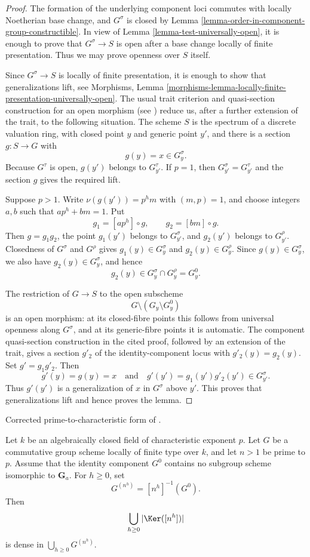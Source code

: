 \begin{proof}
The formation of the underlying component loci commutes with locally
Noetherian base change, and $G^\sigma$ is closed by
Lemma \ref{lemma-order-in-component-group-constructible}. In view of
Lemma \ref{lemma-test-universally-open}, it is enough to prove that
$G^\sigma \to S$ is open after a base change locally of finite presentation.
Thus we may prove openness over $S$ itself.

Since $G^\sigma \to S$ is locally of finite presentation, it is enough to
show that generalizations lift, see Morphisms, Lemma
\ref{morphisms-lemma-locally-finite-presentation-universally-open}. The usual
trait criterion and quasi-section construction for an open morphism
(see \cite[IV, Proposition 14.3.7]{EGA}) reduce us, after a further extension
of the trait, to the following situation. The scheme $S$ is the spectrum of a
discrete valuation ring, with closed point $y$ and generic point $y'$, and
there is a section $g : S \to G$ with
$$
g(y)=x \in G^\sigma_y.
$$
Because $G^\tau$ is open, $g(y')$ belongs to $G^\tau_{y'}$. If $p=1$, then
$G^\sigma_{y'}=G^\tau_{y'}$ and the section $g$ gives the required lift.

Suppose $p>1$. Write $\nu(g(y'))=p^h m$ with $(m,p)=1$, and choose integers
$a,b$ such that $ap^h+bm=1$. Put
$$
g_1=[ap^h]\circ g, \qquad g_2=[bm]\circ g.
$$
Then $g=g_1g_2$, the point $g_1(y')$ belongs to $G^\sigma_{y'}$, and
$g_2(y')$ belongs to $G^\rho_{y'}$. Closedness of $G^\sigma$ and $G^\rho$
gives $g_1(y)\in G^\sigma_y$ and $g_2(y)\in G^\rho_y$. Since
$g(y)\in G^\sigma_y$, we also have $g_2(y)\in G^\sigma_y$, and hence
$$
g_2(y)\in G^\sigma_y\cap G^\rho_y=G^0_y.
$$

The restriction of $G \to S$ to the open subscheme
$$
G\setminus(G_y\setminus G^0_y)
$$
is an open morphism: at its closed-fibre points this follows from universal
openness along $G^\sigma$, and at its generic-fibre points it is automatic.
The component quasi-section construction in the cited proof, followed by an
extension of the trait, gives a section $g'_2$ of the identity-component locus
with $g'_2(y)=g_2(y)$. Set $g'=g_1g'_2$. Then
$$
g'(y)=g(y)=x
\quad\text{and}\quad
g'(y')=g_1(y')g'_2(y')\in G^\sigma_{y'}.
$$
Thus $g'(y')$ is a generalization of $x$ in $G^\sigma$ above $y'$. This proves
that generalizations lift and hence proves the lemma.
\end{proof}

\begin{lemma}
\label{lemma-prime-to-characteristic-torsion-dense}
\begin{reference}
Corrected prime-to-characteristic form of
\cite[Expos\'e 236, Corollary 1.5, pp. 227--228]{FGA}.
\end{reference}
Let $k$ be an algebraically closed field of characteristic exponent $p$.
Let $G$ be a commutative group scheme locally of finite type over $k$, and
let $n > 1$ be prime to $p$. Assume that the identity component $G^0$
contains no subgroup scheme isomorphic to $\mathbf{G}_a$. For $h \geq 0$, set
$$
G^{(n^h)}=[n^h]^{-1}(G^0).
$$
Then
$$
\bigcup_{h \geq 0}|\Ker([n^h])|
$$
is dense in $\bigcup_{h \geq 0}G^{(n^h)}$.
\end{lemma}

